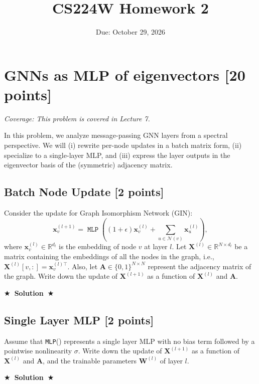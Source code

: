 \documentclass{article}
\title{CS224W Homework 2}
\date{Due: October 29, 2026}
\numberwithin{figure}{section}
\newcommand{\Solution}[1]{%
    {%
        \medskip
        \color{red}
        \bf $\bigstar$~\sf\textbf{Solution}~$\bigstar$ \sf
        #1
    }
    \bigskip
}
\begin{document}
\maketitle

\section{GNNs as MLP of eigenvectors [20 points]}
\noindent \textit{Coverage: This problem is covered in Lecture 7.}

In this problem, we analyze message-passing GNN layers from a spectral perspective. We will (i) rewrite per-node updates in a batch matrix form, (ii) specialize to a single-layer MLP, and (iii) express the layer outputs in the eigenvector basis of the (symmetric) adjacency matrix.

\subsection{Batch Node Update [2 points]}
Consider the update for Graph Isomorphism Network (GIN):
\begin{equation}
\mathbf{x}_v^{(l+1)}=\operatorname{\texttt{MLP}}\left((1+\epsilon)\mathbf{x}_v^{(l)}+\sum_{u\in\mathcal{N}(v)}\mathbf{x}_u^{(l)}\right),
\end{equation}
where $\mathbf{x}_v^{(l)}\in\mathbb{R}^{d_l}$ is the embedding of node $v$ at layer $l$. Let $\textbf{X}^{(l)}\in\mathbb{R}^{N\times d_l}$ be a matrix containing the embeddings of all the nodes in the graph, i.e., $\textbf{X}^{(l)}[v,:]=\mathbf{x}_v^{(l)\top}$. Also, let $\textbf{A}\in\{0,1\}^{N\times N}$ represent the adjacency matrix of the graph. Write down the update of $\textbf{X}^{(l+1)}$ as a function of $\textbf{X}^{(l)}$ and $\textbf{A}$.

\Solution{}

\subsection{Single Layer MLP [2 points]}
Assume that \texttt{MLP}() represents a single layer MLP with no bias term followed by a pointwise nonlinearity $\sigma$. Write down the update of $\textbf{X}^{(l+1)}$ as a function of $\textbf{X}^{(l)}$ and $\textbf{A}$, and the trainable parameters $\textbf{W}^{(l)}$ of layer $l$.

\Solution{}
\end{document}
